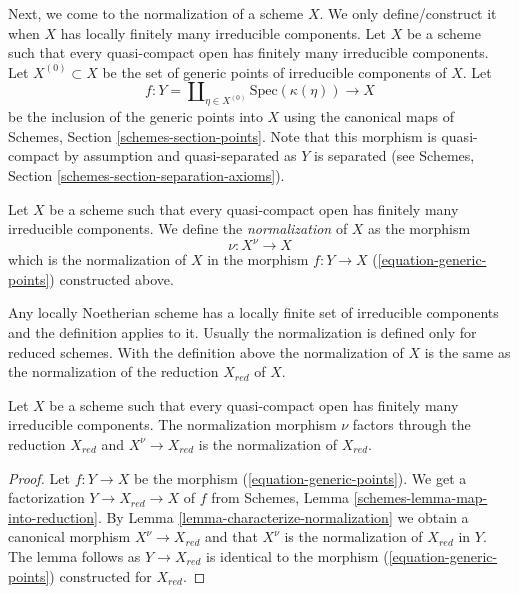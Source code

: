 \noindent
Next, we come to the normalization of a scheme $X$.
We only define/construct it when $X$ has locally finitely many irreducible
components. Let $X$ be a scheme such that every quasi-compact open has
finitely many irreducible components. Let
$X^{(0)} \subset X$ be the set of generic points of irreducible components
of $X$. Let
\begin{equation}
\label{equation-generic-points}
f :
Y = \coprod\nolimits_{\eta \in X^{(0)}} \text{Spec}(\kappa(\eta))
\longrightarrow
X
\end{equation}
be the inclusion of the generic points into $X$ using the
canonical maps of Schemes, Section \ref{schemes-section-points}.
Note that this morphism is quasi-compact by assumption and
quasi-separated as $Y$ is separated (see
Schemes, Section \ref{schemes-section-separation-axioms}).

\begin{definition}
\label{definition-normalization}
Let $X$ be a scheme such that every quasi-compact open has
finitely many irreducible components. We define the
{\it normalization} of $X$ as the morphism
$$
\nu : X^\nu \longrightarrow X
$$
which is the normalization of $X$ in the morphism $f : Y \to X$
(\ref{equation-generic-points}) constructed above.
\end{definition}

\noindent
Any locally Noetherian scheme has a locally finite set of irreducible
components and the definition applies to it.
Usually the normalization is defined only for reduced schemes.
With the definition above the normalization of $X$ is the same
as the normalization of the reduction $X_{red}$ of $X$.

\begin{lemma}
\label{lemma-normalization-reduced}
Let $X$ be a scheme such that every quasi-compact open has
finitely many irreducible components. The normalization morphism
$\nu$ factors through the reduction $X_{red}$ and $X^\nu \to X_{red}$
is the normalization of $X_{red}$.
\end{lemma}

\begin{proof}
Let $f : Y \to X$ be the morphism (\ref{equation-generic-points}).
We get a factorization $Y \to X_{red} \to X$ of $f$ from
Schemes, Lemma \ref{schemes-lemma-map-into-reduction}.
By Lemma \ref{lemma-characterize-normalization} we obtain a canonical
morphism $X^\nu \to X_{red}$
and that $X^\nu$ is the normalization of $X_{red}$ in $Y$.
The lemma follows as $Y \to X_{red}$ is identical to the morphism 
(\ref{equation-generic-points}) constructed for $X_{red}$.
\end{proof}

